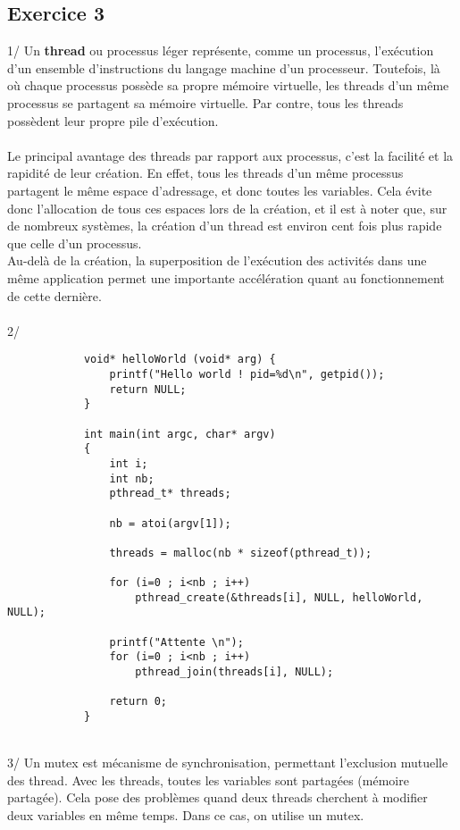 \documentclass[a4paper,11pt]{article}
\begin{document}
	\subsection*{Exercice 3}
		1/ Un \textbf{thread} ou processus léger représente, comme un processus, l'exécution d'un ensemble d'instructions du langage machine d'un processeur. Toutefois, là où chaque processus possède sa propre mémoire virtuelle, les threads d'un même processus se partagent sa mémoire virtuelle. Par contre, tous les threads possèdent leur propre pile d'exécution.
		\\~\\
		Le principal avantage des threads par rapport aux processus, c'est la facilité et la rapidité de leur création. En effet, tous les threads d'un même processus partagent le même espace d'adressage, et donc toutes les variables. Cela évite donc l'allocation de tous ces espaces lors de la création, et il est à noter que, sur de nombreux systèmes, la création d'un thread est environ cent fois plus rapide que celle d'un processus.\\
		Au-delà de la création, la superposition de l'exécution des activités dans une même application permet une importante accélération quant au fonctionnement de cette dernière.
		\\~\\
		2/
		\begin{lstlisting}
			void* helloWorld (void* arg) {
				printf("Hello world ! pid=%d\n", getpid());
				return NULL;
			}
			
			int main(int argc, char* argv)
			{
				int i;
				int nb;
				pthread_t* threads;
				
				nb = atoi(argv[1]);
				
				threads = malloc(nb * sizeof(pthread_t));
				
				for (i=0 ; i<nb ; i++)
					pthread_create(&threads[i], NULL, helloWorld, NULL);
					
				printf("Attente \n");
				for (i=0 ; i<nb ; i++)
					pthread_join(threads[i], NULL);
					
				return 0;
			}
		\end{lstlisting}
		~\\
		3/ Un mutex est mécanisme de synchronisation, permettant l'exclusion mutuelle des thread. Avec les threads, toutes les variables sont partagées (mémoire partagée). Cela pose des problèmes quand deux threads cherchent à modifier deux variables en même temps. Dans ce cas, on utilise un mutex.\\
\end{document}
